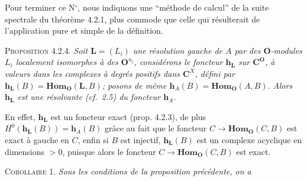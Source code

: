 Pour terminer ce N$^\circ$, nous indiquons une ``méthode de calcul'' de la
suite spectrale du théorème 4.2.1, plus commode que celle qui résulterait de
l'application pure et simple de la définition.

\textsc{Proposition 4.2.4.} \textit{Soit
$\mathbf{L}=(L_i)$ une résolution gauche de $A$ par des ${\mathbf O}$-modules $L_i$
localement isomorphes à des ${\mathbf O}^{n_i}$, considérons le foncteur
$\mathbf{h}_{\mathbf{L}}$ sur $\mathbf C^{\mathbf O}$, à valeurs dans les complexes à degrés
positifs dans $\mathbf C^X$, défini par
$\mathbf{h}_{\mathbf{L}}(B)=\mathbf{Hom}_{\mathbf O}(\mathbf{L},B)$; posons de même
$\mathbf{h}_A(B)=\mathbf{Hom}_{\mathbf O}(A,B)$. Alors $\mathbf{h}_{\mathbf{L}}$ est une
résolvante \textup{(}cf.\ \textup{2.5)} du foncteur $\mathbf{h}_A$.}

En effet, $\mathbf{h}_{\mathbf{L}}$ est un foncteur exact (prop. 4.2.3), de
plus $H^0(\mathbf{h}_{\mathbf{L}}(B))=\mathbf{h}_A(B)$ grâce au fait que le
foncteur $C\to\mathbf{Hom}_{\mathbf O}(C,B)$ est exact à gauche en $C$, enfin si
$B$ est injectif, $\mathbf{h}_{\mathbf{L}}(B)$ est un complexe acyclique en
dimensions $>0$, puisque alors le foncteur
$C\to\mathbf{Hom}_{\mathbf O}(C,B)$ est exact.

\textsc{Corollaire 1.} \textit{Sous les conditions de la proposition
précédente, on a}

